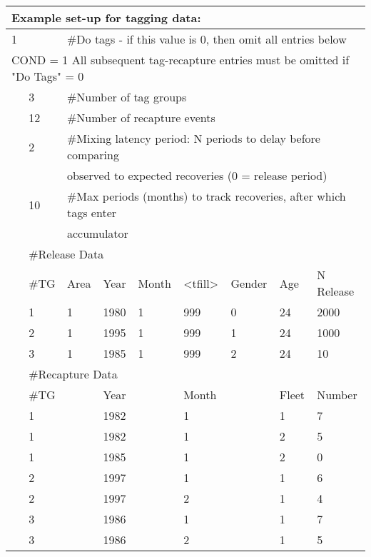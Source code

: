\begin{center}
	\begin{tabular}{p{1.1cm} p{1.1cm} p{1.1cm} p{1.1cm} p{1.1cm} p{1.1cm} p{1.1cm} p{1.1cm} p{1.1cm}}
		\multicolumn{9}{l}{Example set-up for tagging data:}\\
		\hline
		1 & & \multicolumn{7}{l}{\#Do tags - if this value is 0, then omit all entries below}\\
		\hline
		\multicolumn{9}{l}{COND = 1 All subsequent tag-recapture entries must be omitted if "Do Tags" = 0}\\
		 & 3 & \multicolumn{7}{l}{\#Number of tag groups}\\
		 \hline
		 & 12 & \multicolumn{7}{l}{\#Number of recapture events}\\
		 \hline
		 & 2 & \multicolumn{7}{l}{\#Mixing latency period: N periods to delay before comparing }\\
		 &   &  \multicolumn{7}{l}{observed to expected recoveries (0 = release period)}\\
		 \hline
		 & 10 & \multicolumn{7}{l}{\#Max periods (months) to track recoveries, after which tags enter}\\
		 &    & \multicolumn{7}{l}{ accumulator}\\
		 \hline
		 & \multicolumn{8}{l}{\#Release Data} \\
		 & \#TG & Area & Year & Month & <tfill> & Gender & Age & N Release\\ 
		 \hline
		 & 1 & 1 & 1980 & 1 & 999 & 0 & 24 & 2000 \\
		 & 2 & 1 & 1995 & 1 & 999 & 1 & 24 & 1000 \\
		 & 3 & 1 & 1985 & 1 & 999 & 2 & 24 & 10 \\
		 \hline
		 & \multicolumn{8}{l}{\#Recapture Data}\\
		 & \#TG &  & Year&  & Month &  & Fleet  & Number\\ 
		 \hline
		 & 1 & & 1982 & & 1 & & 1 & 7 \\
		 & 1 & & 1982 & & 1 & & 2 & 5 \\
		 & 1 & & 1985 & & 1 & & 2 & 0 \\
		 & 2 & & 1997 & & 1 & & 1 & 6 \\
		 & 2 & & 1997 & & 2 & & 1 & 4 \\
		 & 3 & & 1986 & & 1 & & 1 & 7 \\
		 & 3 & & 1986 & & 2 & & 1 & 5 \\
		 \hline
	\end{tabular}
\end{center}

